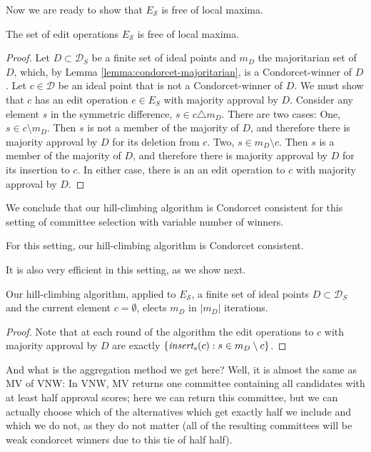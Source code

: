 \documentclass{llncs}
\newcommand{\calD}{\mathcal{D}}
\newcommand{\calS}{\mathcal{S}}
\newcommand{\iinsert}[1]{\emph{insert}_{#1}}
\begin{document}
Now we are ready to show that $E_\calS$ is free of local maxima.

\begin{lemma}
  The set of edit operations $E_\calS$ is free of local maxima.
\end{lemma}

\begin{proof}
%
Let $D \subset \calD_S$ be a finite set of ideal points and $m_D$ the majoritarian set of $D$, which, by Lemma \ref{lemma:condorcet-majoritarian}, is a Condorcet-winner of $D$.  Let $c \in \calD$ be an ideal point that is not a Condorcet-winner of $D$. We must show that
$c$ has an edit operation $e \in E_S$ with majority approval by $D$. Consider any  element $s$ in the symmetric difference,  $s \in c \triangle m_D$.
There are two cases: One, $s \in c \setminus m_D$. Then $s$ is not a member of the majority of $D$, and therefore there is majority approval by $D$ for its deletion from $c$.
Two, $s \in m_D \setminus c$. Then $s$ is a member of the majority of $D$, and therefore there is majority approval by $D$ for its insertion to  $c$. In either case, there is an an edit operation to $c$ with majority approval by $D$.
%
\end{proof}

We conclude that our hill-climbing algorithm is Condorcet consistent for this setting of committee selection with variable number of winners.

\begin{corollary}
  For this setting, our hill-climbing algorithm is Condorcet consistent.
\end{corollary}

It is also very efficient in this setting, as we show next.

\begin{lemma}
Our hill-climbing algorithm, applied to $E_\calS$,  a finite set of ideal points $D \subset \calD_S$ and the current element $c = \emptyset$, elects $m_D$ in $|m_D|$ iterations.
\end{lemma}

\begin{proof}
Note that at each round of the algorithm the edit operations to $c$ with majority approval by $D$ are exactly $\{\iinsert{s}(c) : s \in m_D \setminus c\}$.
\end{proof}

And what is the aggregation method we get here?
Well, it is almost the same as MV of VNW:
  In VNW, MV returns one committee containing all candidates with at least half approval scores; here we can return this committee, but we can actually choose which of the alternatives which get exactly half we include and which we do not, as they do not matter (all of the resulting committees will be weak condorcet winners due to this tie of half half).
  
\end{document}
